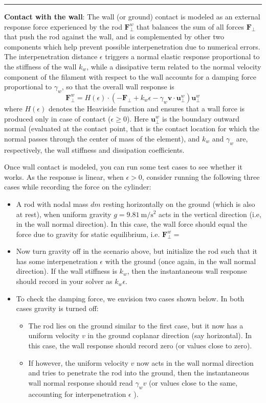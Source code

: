 \documentclass[11pt]{article}
\begin{document}
\noindent\rule{1\textwidth}{0.01pt}
\textbf{Contact with the wall}: The wall (or ground) contact is modeled as an external
response force experienced by the rod \(\mathbf{F}^w_{\perp}\) that balances
the sum of all forces \(\mathbf{F}_{\perp}\) that push the rod against the
wall, and is complemented by other two components which help prevent
possible interpenetration due to numerical errors. The interpenetration
distance \(\epsilon\) triggers a normal elastic response proportional to the
stiffness of the wall \(k_{w}\), while a dissipative term related to the
normal velocity component of the filament with respect to the wall accounts
for a damping force proportional to \(\gamma_w\), so that the overall wall
response is
\[ \mathbf{F}^w_{\perp}= H(\epsilon)\cdot(-\mathbf{F}_{\perp} +
	k_w\epsilon-\gamma_w\mathbf{v}\cdot
	\mathbf{u}^w_{\perp})\mathbf{u}^w_{\perp} \]
where \(H(\epsilon)\) denotes the Heaviside function and ensures that a wall
force is produced only in case of contact (\(\epsilon\ge0\)). Here
\(\mathbf{u}^w_{\perp}\) is the boundary outward normal (evaluated at the
contact point, that is the contact location for which the normal passes
through the center of mass of the element), and \(k_w\) and \(\gamma_w\) are,
respectively, the wall stiffness and dissipation coefficients.

Once wall contact is modeled, you can run some test cases to see
whether it works. As the response is linear, when \(\epsilon > 0\),
consider running the following three cases while recording the force on the
cylinder:
\begin{itemize}
\item A rod with nodal mass \(dm\) resting horizontally on the ground (which
is also at rest), when
uniform gravity \(g = \SI{9.81}{\m\per\s^2}\) acts in the vertical
direction (i.e, in the wall normal direction). In
this case, the wall force should equal the force due to gravity for static
equilibrium, i.e. \(\mathbf{F}^w_{\perp}=\)
\item Now turn gravity off in the scenario above, but initialize the rod such
that it has some interpenetration \(\epsilon\) with the ground (once
again, in the wall normal direction). If the
wall stiffness is \(k_w\), then the instantaneous wall response should
record in your solver as \(k_w \epsilon\).
\item To check the damping force, we envision two cases shown below. In both
cases gravity is turned off:
\begin{itemize}
\item The rod lies on the ground similar to the first case, but it now has a
uniform velocity \(v\) in the ground coplanar direction (say
horizontal). In this case, the wall response should record zero (or
values close to zero).
\item If however, the uniform velocity \(v\) now acts in the wall normal
direction and tries to penetrate the rod into the ground, then the
instantaneous wall normal response should read \(\gamma_w v\) (or
values close to the same, accounting for interpenetration \(\epsilon\) ).
\end{itemize}
\end{itemize}
\end{document}
